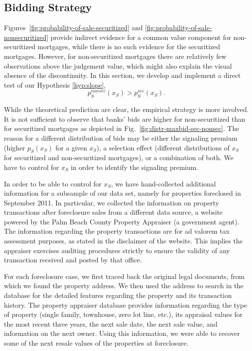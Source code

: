 \documentclass[11pt,twopage]{article}
\begin{document}

\subsection{Bidding Strategy}

Figures~\ref{fig:probability-of-sale-securitized} and
\ref{fig:probability-of-sale-nonsecuritized} provide indirect evidence
for a common value component for non-securitized mortgages, while there is no such evidence for the securitized mortgages. However, for non-securitized mortgages there are relatively few observations above the judgement value, which might also explain the visual absence of the discontinuity. In this section, we develop and implement a direct test of our Hypothesis \ref{hyp:slope},
\[ p_S^{nonsec}(x_S) > p_S^{sec}(x_S).\]

While the theoretical prediction are clear, the empirical strategy is more involved. It is not sufficient to observe that
banks' bids are higher for non-securitized than for securitized mortgages as depicted in Fig.~\ref{fig:distr-maxbid-sec-nonsec}. The reason for a different distribution of bids may
be either the signaling premium (higher $p_S(x_S)$ for a given $x_S$), a selection effect (different distributions
of $x_S$ for securitized and non-securitized mortgages), or a combination of both. We have to control for $x_S$ in order to
identify the signaling premium.


In order to be able to control for $x_S$, we have hand-collected additional information for a subsample of our data set, namely for properties foreclosed in September 2011. In particular, we collected the information on property transactions after foreclosure sales from a different data source, a website powered by the Palm Beach County Property Appraiser (a government agent). The information regarding the property transactions are for ad valorem tax assessment purposes, as stated in the disclaimer of the website. This implies the appraiser exercises auditing procedures strictly to ensure the validity of any transaction received and posted by that office.

For each foreclosure case, we first traced back the original legal documents, from which we found the property address. We then used the address to search in the database for the detailed features regarding the property and its transaction history. The property appraiser database provides information regarding the type of property (single family, townhouse, zero lot line, etc.), its appraisal values for the most recent three years, the next sale date, the next sale value, and information on the next owner. Using this information, we were able to recover some of the next resale values of the properties at foreclosure.
\end{document}
